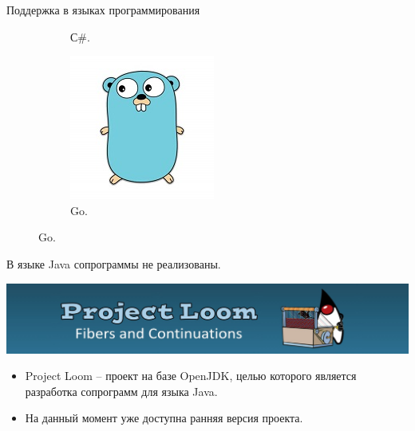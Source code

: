 \begin{frame}{Поддержка в языках программирования}
\begin{figure}
\begin{subfigure}[b]{0.30\linewidth}
		\caption{С\#.}
	\end{subfigure}
	\hfill
	\begin{subfigure}[b]{0.30\linewidth}
		\includegraphics[width=\linewidth]{images/go.jpg}
		\caption{Go.}
	\end{subfigure}
	
	\end{figure}
	\par
	В языке Java сопрограммы не реализованы.
\end{frame}

\begin{frame}
	\includegraphics[scale=0.5]{images/loom.jpg}
	
	\begin{itemize}
	\item	Project Loom – проект на базе OpenJDK, целью которого является разработка сопрограмм для языка Java. 
	\item	На данный момент уже доступна ранняя версия проекта.
	\end{itemize}
\end{frame}

